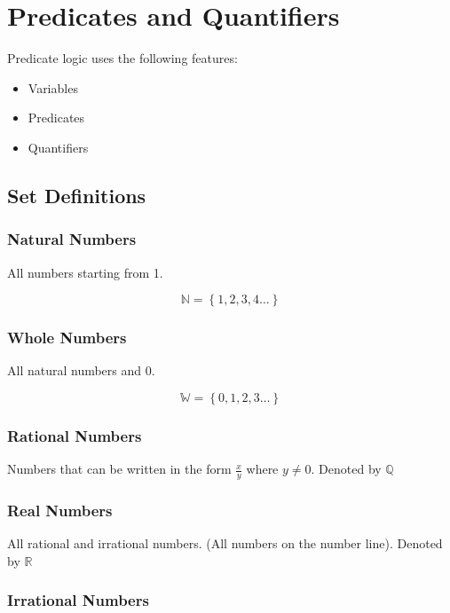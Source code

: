 \documentclass[12pt letter]{report}
\begin{document}
\chapter{Predicates and Quantifiers}

Predicate logic uses the following features:

\begin{itemize}
	\item Variables
	\item Predicates
	\item Quantifiers
\end{itemize}

\section{Set Definitions}

\subsection{Natural Numbers}

All numbers starting from 1.

\[
	\mathbb{N} = \left\{ 1,2,3,4\ldots \right\}
\]

\subsection{Whole Numbers}

All natural numbers and 0.

\[
	\mathbb{W} = \left\{ 0,1,2,3\dots \right\}
\]

\subsection{Rational Numbers}

Numbers that can be written in the form $\frac{x}{y}$ where $y \neq 0$. Denoted by $\mathbb{Q}$

\subsection{Real Numbers}

All rational and irrational numbers. (All numbers on the number line). Denoted by $\mathbb{R}$

\subsection{Irrational Numbers}
\end{document}
